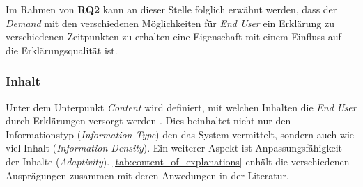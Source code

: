 \bigskip

Im Rahmen von \textbf{RQ2} kann an dieser Stelle folglich erwähnt werden, dass der \textit{Demand} mit den verschiedenen Möglichkeiten für \textit{End User} ein Erklärung zu verschiedenen Zeitpunkten zu erhalten eine Eigenschaft mit einem Einfluss auf die Erklärungsqualität ist.

\subsubsection{Inhalt}

Unter dem Unterpunkt \textit{Content} wird definiert, mit welchen Inhalten die \textit{End User} durch Erklärungen versorgt werden \cite{nunes_systematic_2017}. Dies beinhaltet nicht nur den Informationstyp (\textit{Information Type}) den das System vermittelt, sondern auch wie viel Inhalt (\textit{Information Density}). Ein weiterer Aspekt ist Anpassungsfähigkeit der Inhalte (\textit{Adaptivity}). \autoref{tab:content_of_explanations} enhält die verschiedenen Ausprägungen zusammen mit deren Anwedungen in der Literatur.


